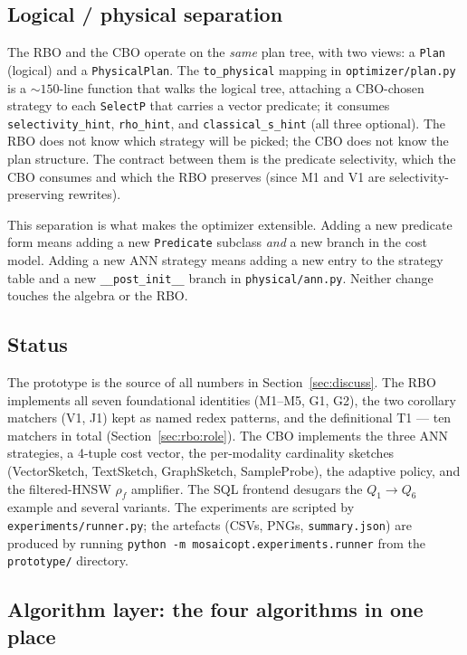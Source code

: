 \documentclass[sigconf,nonacm,review]{acmart}
\theoremstyle{plain}
\theoremstyle{definition}
\theoremstyle{remark}
\begin{document}
\subsection{Logical / physical separation}\label{app:proto:lp}

The RBO and the CBO operate on the \emph{same} plan tree,
with two views: a \texttt{Plan} (logical) and a
\texttt{PhysicalPlan}. The \texttt{to\_physical} mapping in
\texttt{optimizer/plan.py} is a $\sim 150$-line function that
walks the logical tree, attaching a CBO-chosen strategy to
each \texttt{SelectP} that carries a vector predicate; it
consumes \texttt{selectivity\_hint}, \texttt{rho\_hint}, and
\texttt{classical\_s\_hint} (all three optional). The RBO
does not know which strategy will be picked; the CBO does
not know the plan structure. The contract between them is
the predicate selectivity, which the CBO consumes and which
the RBO preserves (since M1 and V1 are selectivity-preserving
rewrites).

This separation is what makes the optimizer extensible. Adding
a new predicate form means adding a new \texttt{Predicate}
subclass \emph{and} a new branch in the cost model. Adding a
new ANN strategy means adding a new entry to the strategy
table and a new \texttt{\_\_post\_init\_\_} branch in
\texttt{physical/ann.py}. Neither change touches the algebra
or the RBO.

\subsection{Status}\label{app:proto:status}

The prototype is the source of all numbers in
Section~\ref{sec:discuss}. The RBO implements all seven
foundational identities (M1--M5, G1, G2), the two corollary
matchers (V1, J1) kept as named redex patterns, and the
definitional T1 --- ten matchers in total
(Section~\ref{sec:rbo:role}). The CBO implements the three
ANN strategies, a 4-tuple cost vector, the per-modality
cardinality sketches (VectorSketch, TextSketch, GraphSketch,
SampleProbe), the adaptive policy, and the filtered-HNSW
$\rho_f$ amplifier. The SQL frontend desugars the
$Q_1 \to Q_6$ example and several variants. The experiments
are scripted by \texttt{experiments/runner.py}; the
artefacts (CSVs, PNGs, \texttt{summary.json}) are produced by
running \texttt{python -m mosaicopt.experiments.runner} from
the \texttt{prototype/} directory.

\subsection{Algorithm layer: the four algorithms in one place}\label{app:proto:algos}
\end{document}
